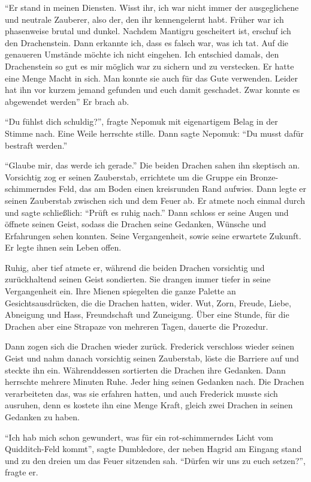 \enquote{Er stand in meinen Diensten. Wisst ihr, ich war nicht immer der ausgeglichene und neutrale Zauberer, also der, den ihr kennengelernt habt. Früher war ich phasenweise brutal und dunkel. Nachdem Mantigru gescheitert ist, erschuf ich den Drachenstein. Dann erkannte ich, dass es falsch war, was ich tat. Auf die genaueren Umstände möchte ich nicht eingehen. Ich entschied damals, den Drachenstein so gut es mir möglich war zu sichern und zu verstecken. Er hatte eine Menge Macht in sich. Man konnte sie auch für das Gute verwenden. Leider hat ihn vor kurzem jemand gefunden und euch damit geschadet. Zwar konnte es abgewendet werden\abs} Er brach ab.

\enquote{Du fühlst dich schuldig?}, fragte Nepomuk mit eigenartigem Belag in der Stimme nach. Eine Weile herrschte stille. Dann sagte Nepomuk: \enquote{Du musst dafür bestraft werden.}

\enquote{Glaube mir, das werde ich gerade.} Die beiden Drachen sahen ihn skeptisch an. Vorsichtig zog er seinen Zauberstab, errichtete um die Gruppe ein Bronze-schimmerndes Feld, das am Boden einen kreisrunden Rand aufwies. Dann legte er seinen Zauberstab zwischen sich und dem Feuer ab. Er atmete noch einmal durch und sagte schließlich: \enquote{Prüft es ruhig nach.} Dann schloss er seine Augen und öffnete seinen Geist, sodass die Drachen seine Gedanken, Wünsche und Erfahrungen sehen konnten. Seine Vergangenheit, sowie seine erwartete Zukunft. Er legte ihnen sein Leben offen.

Ruhig, aber tief atmete er, während die beiden Drachen vorsichtig und zurückhaltend seinen Geist sondierten. Sie drangen immer tiefer in seine Vergangenheit ein. Ihre Mienen spiegelten die ganze Palette an Gesichtsausdrücken, die die Drachen hatten, wider. Wut, Zorn, Freude, Liebe, Abneigung und Hass, Freundschaft und Zuneigung. Über eine Stunde, für die Drachen aber eine Strapaze von mehreren Tagen, dauerte die Prozedur.

Dann zogen sich die Drachen wieder zurück. Frederick verschloss wieder seinen Geist und nahm danach vorsichtig seinen Zauberstab, löste die Barriere auf und steckte ihn ein. Währenddessen sortierten die Drachen ihre Gedanken. Dann herrschte mehrere Minuten Ruhe. Jeder hing seinen Gedanken nach. Die Drachen verarbeiteten das, was sie erfahren hatten, und auch Frederick musste sich ausruhen, denn es kostete ihn eine Menge Kraft, gleich zwei Drachen in seinen Gedanken zu haben.

\enquote{Ich hab mich schon gewundert, was für ein rot-schimmerndes Licht vom Quidditch-Feld kommt}, sagte Dumbledore, der neben Hagrid am Eingang stand und zu den dreien um das Feuer sitzenden sah. \enquote{Dürfen wir uns zu euch setzen?}, fragte er.

